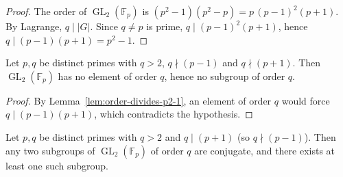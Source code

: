 \begin{proof}
The order of $\operatorname{GL}_2(\mathbb{F}_p)$ is $(p^2-1)(p^2-p) = p\,(p-1)^2(p+1)$. By Lagrange, $q \mid |G|$. Since $q \ne p$ is prime, $q \mid (p-1)^2(p+1)$, hence $q \mid (p-1)(p+1) = p^2-1$.
\end{proof}

\begin{lemma}\label{lem:no-order-q}
\leanok
Let $p,q$ be distinct primes with $q > 2$, $q \nmid (p-1)$ and $q \nmid (p+1)$. Then $\operatorname{GL}_2(\mathbb{F}_p)$ has no element of order $q$, hence no subgroup of order $q$.
\end{lemma}

\begin{proof}
By Lemma~\ref{lem:order-divides-p2-1}, an element of order $q$ would force $q \mid (p-1)(p+1)$, which contradicts the hypothesis.
\end{proof}

\begin{lemma}\label{lem:case-pp1}
\leanok
Let $p,q$ be distinct primes with $q > 2$ and $q \mid (p+1)$ (so $q \nmid (p-1)$). Then any two subgroups of $\operatorname{GL}_2(\mathbb{F}_p)$ of order $q$ are conjugate, and there exists at least one such subgroup.
\end{lemma}

